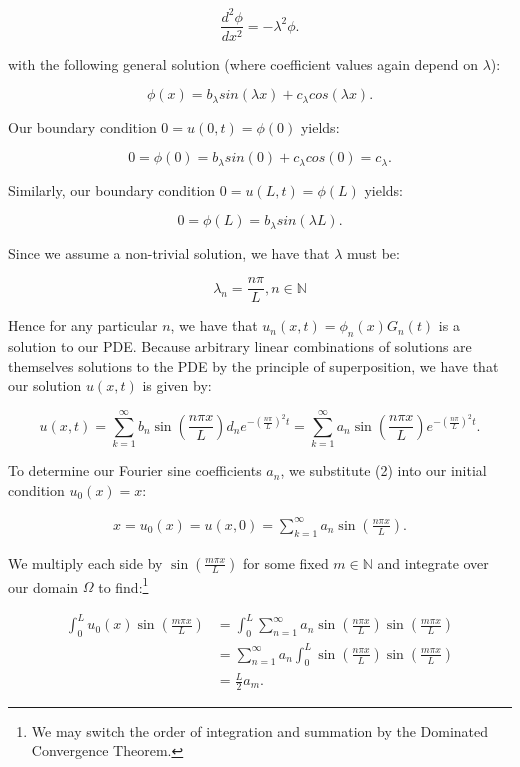 \begin{solution}
    $$
    \frac{d^2 \phi}{d x^2} = -\lambda^2 \phi.
    $$

    with the following general solution (where coefficient values again depend on $\lambda$):

    $$
    \phi(x) = b_{\lambda} sin(\lambda x) + c_{\lambda} cos(\lambda x).
    $$

    Our boundary condition $0 = u(0, t) = \phi(0)$ yields:

    $$
    0 = \phi(0) = b_{\lambda} sin(0) + c_{\lambda} cos(0) = c_{\lambda}.
    $$

    Similarly, our boundary condition $0 = u(L, t) = \phi(L)$ yields:

    $$
    0 = \phi(L) = b_{\lambda} sin(\lambda L).
    $$

    Since we assume a non-trivial solution, we have that $\lambda$ must be:

    $$
    \lambda_n = \frac{n \pi}{L}, n \in \mathbb{N}
    $$

    Hence for any particular $n$, we have that $u_n(x, t) = \phi_n(x)G_n(t)$ is a solution to our PDE. Because arbitrary
    linear combinations of solutions are themselves solutions to the PDE by the principle of superposition, we have that
    our solution $u(x, t)$ is given by:

    \begin{equation}
    u(x, t) = \sum\limits_{k=1}^{\infty}{b_n \sin\left(\frac{n \pi x}{L}\right)} d_n e^{-\left(\frac{n \pi}{L}\right)^2 t}
            = \sum\limits_{k=1}^{\infty}{a_n \sin\left(\frac{n \pi x}{L}\right)} e^{-\left(\frac{n \pi}{L}\right)^2 t}.
    \end{equation}

    To determine our Fourier sine coefficients $a_n$, we substitute (2) into our initial condition $u_0(x) = x$:

    \begin{align*}
        x = u_0(x) = u(x, 0) = \sum\limits_{k=1}^{\infty}{a_n \sin\left(\frac{n \pi x}{L}\right)}.
    \end{align*}

    We multiply each side by $\sin\left(\frac{m \pi x}{L}\right)$ for some fixed $m \in \mathbb{N}$ and integrate over 
    our domain $\Omega$ to find:\footnote{
        We may switch the order of integration and summation by the Dominated Convergence Theorem.
    }

    \begin{align*}
        \int_{0}^{L}{u_0(x) \sin{\left(\frac{m \pi x}{L}\right)}} 
            &= \int_{0}^{L}{\sum\limits_{n=1}^{\infty}{a_n \sin\left(\frac{n \pi x}{L}\right) \sin\left(\frac{m \pi x}{L}\right) }} \\
            &= \sum\limits_{n=1}^{\infty}{a_n \int_{0}^{L}{\sin\left(\frac{n \pi x}{L}\right) \sin\left(\frac{m \pi x}{L}\right) }} \\
            &= \frac{L}{2} a_m.
    \end{align*}


\end{solution}

